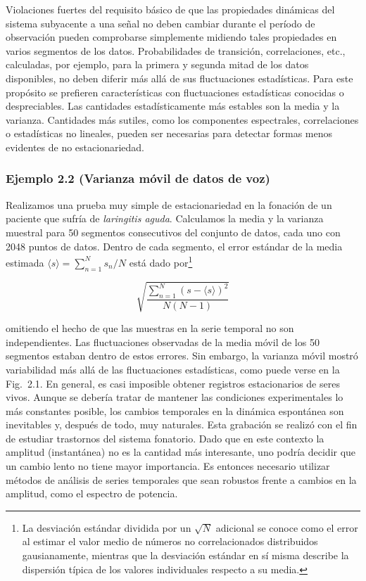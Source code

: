 \documentclass[10pt,a4paper]{book}
\begin{document}
Violaciones fuertes del requisito básico de que las propiedades dinámicas del sistema subyacente a una señal no deben cambiar durante el período de observación pueden comprobarse simplemente midiendo tales propiedades en varios segmentos de los datos. Probabilidades de transición, correlaciones, etc., calculadas, por ejemplo, para la primera y segunda mitad de los datos disponibles, no deben diferir más allá de sus fluctuaciones estadísticas. Para este propósito se prefieren características con fluctuaciones estadísticas conocidas o despreciables. Las cantidades estadísticamente más estables son la media y la varianza. Cantidades más sutiles, como los componentes espectrales, correlaciones o estadísticas no lineales, pueden ser necesarias para detectar formas menos evidentes de no estacionariedad.

\subsubsection*{Ejemplo 2.2 (Varianza móvil de datos de voz)}

Realizamos una prueba muy simple de estacionariedad en la fonación de un paciente que sufría de \emph{laringitis aguda}. Calculamos la media y la varianza muestral para 50 segmentos consecutivos del conjunto de datos, cada uno con 2048 puntos de datos. Dentro de cada segmento, el error estándar de la media estimada $\langle s \rangle = \sum_{n=1}^N s_n / N$ está dado por\footnote{La desviación estándar dividida por un $\sqrt{N}$ adicional se conoce como el error al estimar el valor medio de números no correlacionados distribuidos gausianamente, mientras que la desviación estándar en sí misma describe la dispersión típica de los valores individuales respecto a su media.}

\begin{equation}
	\sqrt{ \frac{\sum_{n=1}^N (s - \langle s \rangle)^2}{N(N-1)} }
\end{equation}


omitiendo el hecho de que las muestras en la serie temporal no son independientes. Las fluctuaciones observadas de la media móvil de los 50 segmentos estaban dentro de estos errores. Sin embargo, la varianza móvil mostró variabilidad más allá de las fluctuaciones estadísticas, como puede verse en la Fig.~2.1. En general, es casi imposible obtener registros estacionarios de seres vivos. Aunque se debería tratar de mantener las condiciones experimentales lo más constantes posible, los cambios temporales en la dinámica espontánea son inevitables y, después de todo, muy naturales. Esta grabación se realizó con el fin de estudiar trastornos del sistema fonatorio. Dado que en este contexto la amplitud (instantánea) no es la cantidad más interesante, uno podría decidir que un cambio lento no tiene mayor importancia. Es entonces necesario utilizar métodos de análisis de series temporales que sean robustos frente a cambios en la amplitud, como el espectro de potencia. 
\end{document}
